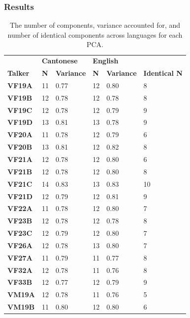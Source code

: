 \subsubsection{Results}

\begin{table}[ptbh]
    \caption{The number of components, variance accounted for, and number of identical components across languages for each PCA.}
\label{ch3:tab:componentcount}
\centering
{\footnotesize 
    \begin{tabular}{llllll}
    
    \toprule
     & \multicolumn{2}{l}{\textbf{Cantonese}} & \multicolumn{2}{l}{\textbf{English}} &  \\
    \textbf{Talker} & \textbf{N} & \textbf{Variance} & \textbf{N} & \textbf{Variance} & \textbf{Identical N} \\
    \midrule
    \textbf{VF19A} & 11 & 0.77 & 12 & 0.80 & 8 \\
    \textbf{VF19B} & 12 & 0.78 & 12 & 0.78 & 8 \\
    \textbf{VF19C} & 12 & 0.78 & 12 & 0.79 & 9 \\
    \textbf{VF19D} & 13 & 0.81 & 13 & 0.78 & 9 \\
    \textbf{VF20A} & 11 & 0.78 & 12 & 0.79 & 6 \\
    \textbf{VF20B} & 13 & 0.81 & 12 & 0.82 & 8 \\
    \textbf{VF21A} & 12 & 0.78 & 12 & 0.80 & 6 \\
    \textbf{VF21B} & 12 & 0.78 & 12 & 0.80 & 8 \\
    \textbf{VF21C} & 14 & 0.83 & 13 & 0.83 & 10 \\
    \textbf{VF21D} & 12 & 0.79 & 12 & 0.81 & 9 \\
    \textbf{VF22A} & 11 & 0.78 & 12 & 0.80 & 7 \\
    \textbf{VF23B} & 12 & 0.78 & 12 & 0.78 & 8 \\
    \textbf{VF23C} & 12 & 0.79 & 12 & 0.80 & 7 \\
    \textbf{VF26A} & 12 & 0.78 & 13 & 0.80 & 7 \\
    \textbf{VF27A} & 11 & 0.79 & 11 & 0.77 & 8 \\
    \textbf{VF32A} & 12 & 0.78 & 11 & 0.76 & 8 \\
    \textbf{VF33B} & 12 & 0.77 & 12 & 0.79 & 9 \\
    \textbf{VM19A} & 12 & 0.78 & 11 & 0.76 & 5 \\
    \textbf{VM19B} & 11 & 0.80 & 12 & 0.80 & 6 \\

\end{tabular}}
\end{table}
